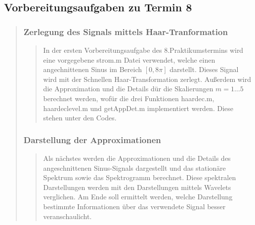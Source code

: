     \subsection{Vorbereitungsaufgaben zu Termin 8}
    \begin{quote}
    
        \subsubsection{Zerlegung des Signals mittels Haar-Tranformation}
        \begin{quote}
        
        In der ersten Vorbereitungsaufgabe des 8.Praktikumstermins wird eine
        vorgegebene strom.m Datei verwendet, welche einen angechnittenen Sinus
        im Bereich $[0,8\pi]$ darstellt. Dieses Signal wird mit der Schnellen
        Haar-Transformation zerlegt. Außerdem wird die Approximation und die
        Details dür die Skalierungen $m = 1 \ldots 5$ berechnet werden, wofür
        die drei Funktionen haardec.m, haardeclevel.m und getAppDet.m
        implementiert werden. Diese stehen unter den Codes.
        
        \end{quote}%
        
        
        \subsubsection{Darstellung der Approximationen}
        \begin{quote}
        
        Als nächstes werden die Approximationen und die Details des
        angeschnittenen Sinus-Signals dargestellt und das stationäre Spektrum
        sowie das Spektrogramm berechnet. Diese spektralen Darstellungen werden
        mit den Darstellungen mittels Wavelets verglichen. Am Ende soll
        ermittelt werden, welche Darstellung bestimmte Informationen über das
        verwendete Signal besser veranschaulicht.\\
        

\end{quote}
\end{quote}
